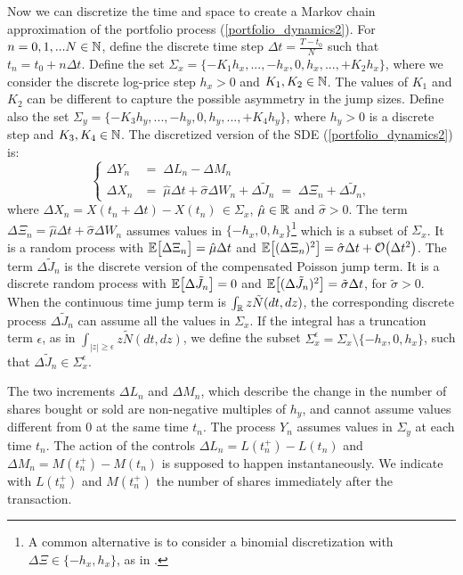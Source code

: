 Now we can discretize the time and space to create a Markov chain approximation of the portfolio process (\ref{portfolio_dynamics2}).
For $n = 0,1, ... N \in \mathbb{N}$, define the discrete time step $ \Delta t = \frac{T - t_0}{N} $ such that
$t_n = t_0 + n \Delta t$.
Define the set $\Sigma_x = \{-K_1 h_x , ... , -h_x,0,h_x, ... , +K_2 h_x \}$,  
where we consider the discrete log-price step $h_x > 0$ and $K_1,K_2 \in \mathbb{N}$. The values of $K_1$ and $K_2$ can be 
different to capture the possible asymmetry in the jump sizes.
Define also the set $\Sigma_y = \{-K_3 h_y , ... , -h_y,0,h_y, ... , + K_4 h_y \} $, 
where $h_y>0$ is a discrete step and $K_3,K_4 \in \mathbb{N}$. 
The discretized version of the SDE (\ref{portfolio_dynamics2}) is: 
\begin{equation}\label{log_sde_discr}
 \begin{cases}
 \Delta Y_n &= \; \Delta L_n - \Delta M_n \\
 \Delta X_n &= \; \hat \mu  \Delta t + \hat \sigma \Delta W_n + \Delta \tilde J_n \; = \; \Delta \Xi_n + \Delta \tilde J_n,
\end{cases}
\end{equation} 
where $\Delta X_n = X(t_n +\Delta t)-X(t_n) \, \in \Sigma_x$, $\hat \mu \in \mathbb{R}$ and $\hat \sigma > 0$. 
The term $\Delta \Xi_n = \hat \mu  \Delta t + \hat \sigma \Delta W_n$ assumes values in $\{ -h_x, 0, h_x\}$\footnote{A common alternative is to consider a binomial discretization 
with $\Delta \Xi \in \{-h_x,h_x\}$, as in \cite{DaPaZa93}. }
which is a subset of $\Sigma_x$.
It is a random process with $\mathbb{E}\bigl[\Delta \Xi_n\bigr] = \hat \mu  \Delta t$ and $\mathbb{E}\bigl[(\Delta \Xi_n)^2\bigr] = \hat \sigma \Delta t + \mathcal{O}\bigl(\Delta t^2 \bigr)$. 
The term $\Delta \tilde J_n$ is the discrete version of the compensated Poisson jump term. It is a discrete random process with $\mathbb{E}\bigl[\Delta \tilde J_n\bigr] = 0$ 
and $\mathbb{E}\bigl[(\Delta \tilde J_n)^2\bigr] = \tilde \sigma \Delta t$, for $\tilde \sigma > 0$. 
When the continuous time jump term is $\int_{\mathbb{R}} z \tilde N(dt,dz)$, 
the corresponding discrete process $\Delta \tilde J_n$ can assume all the values in $ \Sigma_x $.
If the integral has a truncation term $\epsilon$, as in $\int_{|z| \geq \epsilon} z \tilde N(dt,dz)$, we define the subset 
$ \Sigma^{\epsilon}_x = \Sigma_x \setminus \{ -h_x, 0, h_x\}$, such that $\Delta \tilde J_n \in \Sigma^{\epsilon}_x$.

The two increments $\Delta L_n$ and $\Delta M_n$, which describe the change in the number of shares bought or sold are non-negative multiples of $h_y$, 
and cannot assume values different from $0$ at the same time $t_n$.
The process $Y_n$ assumes values in $\Sigma_y$ at each time $t_n$.
The action of the controls $\Delta L_n = L(t_n^+)-L(t_n)$ and $\Delta M_n = M(t_n^+)-M(t_n)$ is supposed to happen instantaneously. 
We indicate with 
$L(t_n^+)$ and $M(t_n^+)$ the number of shares immediately after the transaction.

